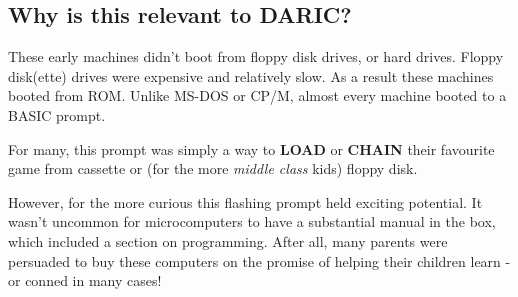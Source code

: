 \documentclass[10pt]{book}
\newcommand{\DARIC}{DARIC}
\begin{document}
\subsection{Why is this relevant to \DARIC?}
\par{These early machines didn't boot from floppy disk drives, or hard drives. Floppy disk(ette) drives were expensive and relatively slow. As a result these machines booted from ROM. Unlike MS-DOS or CP/M, almost every machine booted to a BASIC prompt.}
\par{For many, this prompt was simply a way to \textbf{LOAD} or \textbf{CHAIN} their favourite game from cassette or (for the more \emph{middle class} kids) floppy disk.}
\par{However, for the more curious this flashing prompt held exciting potential. It wasn't uncommon for microcomputers to have a substantial manual in the box, which included a section on programming. After all, many parents were persuaded to buy these computers on the promise of helping their children learn - or conned in many cases!}
\end{document}
